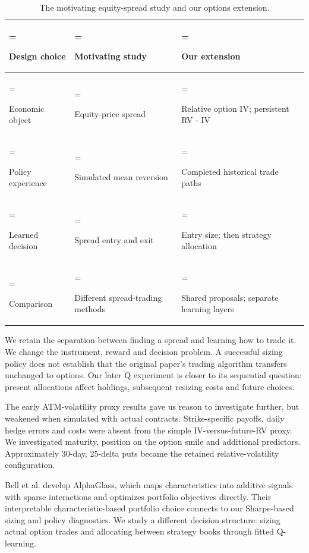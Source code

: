 \begin{table}[H]\centering\small
\caption{The motivating equity-spread study and our options extension.}
\setlength{\tabcolsep}{4pt}\renewcommand{\arraystretch}{1.18}
\begin{tabularx}{\textwidth}{@{}>{\hsize=0.64453\hsize\linewidth=\hsize\raggedright\arraybackslash}X>{\hsize=1.01953\hsize\linewidth=\hsize\raggedright\arraybackslash}X>{\hsize=1.33594\hsize\linewidth=\hsize\raggedright\arraybackslash}X@{}}\toprule
\textbf{Design choice} & \textbf{Motivating study} & \textbf{Our extension}\\\midrule
Economic object & Equity-price spread & Relative option IV; persistent RV - IV\\
Policy experience & Simulated mean reversion & Completed historical trade paths\\
Learned decision & Spread entry and exit & Entry size; then strategy allocation\\
Comparison & Different spread-trading methods & Shared proposals; separate learning layers\\
\bottomrule\end{tabularx}\end{table}

We retain the separation between finding a spread and learning how to trade it. We change the instrument, reward and decision problem. A successful sizing policy does not establish that the original paper's trading algorithm transfers unchanged to options. Our later Q experiment is closer to its sequential question: present allocations affect holdings, subsequent resizing costs and future choices.


The early ATM-volatility proxy results gave us reason to investigate further, but weakened when simulated with actual contracts. Strike-specific payoffs, daily hedge errors and costs were absent from the simple IV-versus-future-RV proxy. We investigated maturity, position on the option smile and additional predictors. Approximately 30-day, 25-delta puts became the retained relative-volatility configuration.


Bell et al. \cite{alphaglass2026} develop AlphaGlass, which maps characteristics into additive signals with sparse interactions and optimizes portfolio objectives directly. Their interpretable characteristic-based portfolio choice connects to our Sharpe-based sizing and policy diagnostics. We study a different decision structure: sizing actual option trades and allocating between strategy books through fitted Q-learning.
